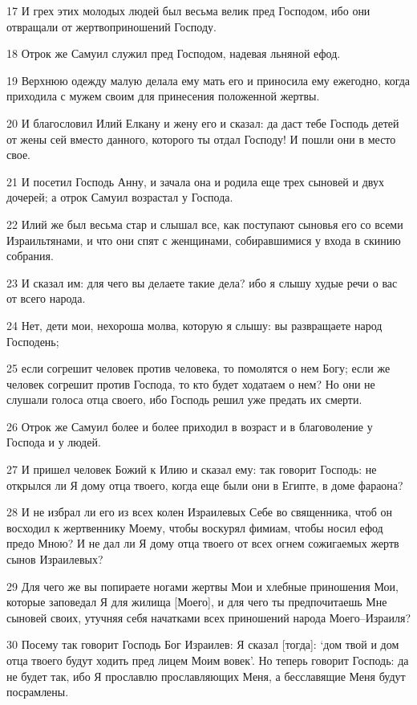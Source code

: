 \par 17 И грех этих молодых людей был весьма велик пред Господом, ибо они отвращали от жертвоприношений Господу.
\par 18 Отрок же Самуил служил пред Господом, надевая льняной ефод.
\par 19 Верхнюю одежду малую делала ему мать его и приносила ему ежегодно, когда приходила с мужем своим для принесения положенной жертвы.
\par 20 И благословил Илий Елкану и жену его и сказал: да даст тебе Господь детей от жены сей вместо данного, которого ты отдал Господу! И пошли они в место свое.
\par 21 И посетил Господь Анну, и зачала она и родила еще трех сыновей и двух дочерей; а отрок Самуил возрастал у Господа.
\par 22 Илий же был весьма стар и слышал все, как поступают сыновья его со всеми Израильтянами, и что они спят с женщинами, собиравшимися у входа в скинию собрания.
\par 23 И сказал им: для чего вы делаете такие дела? ибо я слышу худые речи о вас от всего народа.
\par 24 Нет, дети мои, нехороша молва, которую я слышу: вы развращаете народ Господень;
\par 25 если согрешит человек против человека, то помолятся о нем Богу; если же человек согрешит против Господа, то кто будет ходатаем о нем? Но они не слушали голоса отца своего, ибо Господь решил уже предать их смерти.
\par 26 Отрок же Самуил более и более приходил в возраст и в благоволение у Господа и у людей.
\par 27 И пришел человек Божий к Илию и сказал ему: так говорит Господь: не открылся ли Я дому отца твоего, когда еще были они в Египте, в доме фараона?
\par 28 И не избрал ли его из всех колен Израилевых Себе во священника, чтоб он восходил к жертвеннику Моему, чтобы воскурял фимиам, чтобы носил ефод предо Мною? И не дал ли Я дому отца твоего от всех огнем сожигаемых жертв сынов Израилевых?
\par 29 Для чего же вы попираете ногами жертвы Мои и хлебные приношения Мои, которые заповедал Я для жилища [Моего], и для чего ты предпочитаешь Мне сыновей своих, утучняя себя начатками всех приношений народа Моего--Израиля?
\par 30 Посему так говорит Господь Бог Израилев: Я сказал [тогда]: `дом твой и дом отца твоего будут ходить пред лицем Моим вовек'. Но теперь говорит Господь: да не будет так, ибо Я прославлю прославляющих Меня, а бесславящие Меня будут посрамлены.
